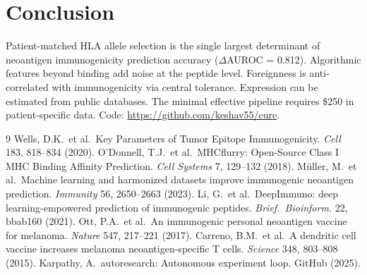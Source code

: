 \documentclass[11pt,twocolumn]{article}
\begin{document}
\section{Conclusion}

Patient-matched HLA allele selection is the single largest determinant of neoantigen immunogenicity prediction accuracy ($\Delta$AUROC = 0.812). Algorithmic features beyond binding add noise at the peptide level. Foreignness is anti-correlated with immunogenicity via central tolerance. Expression can be estimated from public databases. The minimal effective pipeline requires \$250 in patient-specific data. Code: \url{https://github.com/keshav55/cure}.

\begin{thebibliography}{9}
 Wells, D.K.\ et al.\ Key Parameters of Tumor Epitope Immunogenicity. \textit{Cell} 183, 818--834 (2020).
 O'Donnell, T.J.\ et al.\ MHCflurry: Open-Source Class I MHC Binding Affinity Prediction. \textit{Cell Systems} 7, 129--132 (2018).
 M\"{u}ller, M.\ et al.\ Machine learning and harmonized datasets improve immunogenic neoantigen prediction. \textit{Immunity} 56, 2650--2663 (2023).
 Li, G.\ et al.\ DeepImmuno: deep learning-empowered prediction of immunogenic peptides. \textit{Brief.\ Bioinform.} 22, bbab160 (2021).
 Ott, P.A.\ et al.\ An immunogenic personal neoantigen vaccine for melanoma. \textit{Nature} 547, 217--221 (2017).
 Carreno, B.M.\ et al.\ A dendritic cell vaccine increases melanoma neoantigen-specific T cells. \textit{Science} 348, 803--808 (2015).
 Karpathy, A.\ autoresearch: Autonomous experiment loop. GitHub (2025).
\end{thebibliography}
\end{document}

